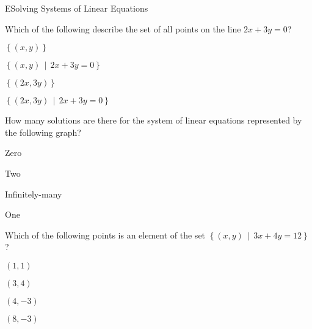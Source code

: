 \documentclass{article}[12pt]
\begin{document}
\begin{module}{E}{Solving Systems of Linear Equations}
\begin{readinessAssuranceTest}

\item Which of the following describe the set of all points on the line \(2x+3y=0\)?
\begin{multicols}{4}
\begin{readinessAssuranceTestChoices}
\item \(\displaystyle \left\{ (x,y) \right\}\)
\item \(\displaystyle \left\{ (x,y) \,\middle|\, 2x+3y=0 \right\}\) %
\item \(\displaystyle \left\{ (2x,3y) \right\}\)
\item \(\displaystyle \left\{ (2x,3y) \,\middle|\, 2x+3y=0 \right\}\)
\end{readinessAssuranceTestChoices}
\end{multicols}


\item How many solutions are there for the system of linear equations
      represented by the following graph?
    \begin{center}
      \systemWithOneSolutionB[0.23]
    \end{center}

\begin{multicols}{4}
\begin{readinessAssuranceTestChoices}
\item Zero
\item Two
\item Infinitely-many
\item One %
\end{readinessAssuranceTestChoices}
\end{multicols}

\item Which of the following points is an element of the set 
		\(\displaystyle \left\{ (x,y) \,\middle|\, 3x+4y=12 \right\}\) ?
\begin{multicols}{4}
\begin{readinessAssuranceTestChoices}
\item \( (1,1) \)
\item \( (3,4) \)
\item \( (4,-3) \)
\item \( (8,-3) \) %
\end{readinessAssuranceTestChoices}
\end{multicols}


\end{readinessAssuranceTest}
\end{module}
\end{document}
